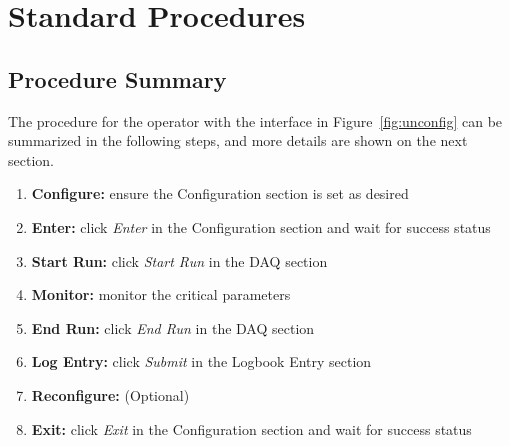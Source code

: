 \documentclass[amsmath,amssymb,notitlepage,12pt]{revtex4}
\begin{document}
\section{Standard Procedures}\label{sec:user}

\subsection{Procedure Summary}
The procedure for the operator with the interface in Figure~\ref{fig:unconfig} can be summarized in the following steps, and more details are shown on the next section.
\begin{enumerate}
\vspace{-4mm}\item {\bf Configure:}  ensure the Configuration section is set as desired
\vspace{-4mm}\item {\bf Enter:} click {\em Enter} in the Configuration section and wait for success status
\vspace{-4mm}\item {\bf Start Run:} click {\em Start Run} in the DAQ section
\vspace{-4mm}\item {\bf Monitor:} monitor the critical parameters
\vspace{-4mm}\item {\bf End Run:} click {\em End Run} in the DAQ section
\vspace{-4mm}\item {\bf Log Entry:} click {\em Submit} in the Logbook Entry section 
\vspace{-4mm}\item {\bf Reconfigure:} (Optional)
\vspace{-4mm}\item {\bf Exit:} click {\em Exit} in the Configuration section and wait for success status
\end{enumerate}
\end{document}
